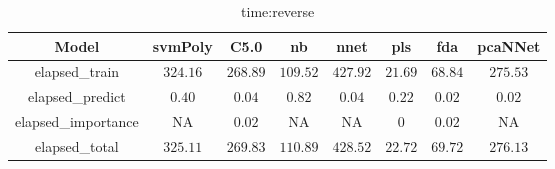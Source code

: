 \begin{table}[!ht]
	\centering
	\begin{tabular}{|c|c|c|c|c|c|c|c|}
		\hline
		Model & svmPoly & C5.0 & nb & nnet & pls & fda & pcaNNet \\ \hline
		elapsed_train & $324.16$ & $268.89$ & $109.52$ & $427.92$ & $21.69$ & $68.84$ & $275.53$ \\ \hline
		elapsed_predict & $0.40$ & $0.04$ & $0.82$ & $0.04$ & $0.22$ & $0.02$ & $0.02$ \\ \hline
		elapsed_importance & NA & $0.02$ & NA & NA & $0$ & $0.02$ & NA \\ \hline
		elapsed_total & $325.11$ & $269.83$ & $110.89$ & $428.52$ & $22.72$ & $69.72$ & $276.13$ \\ \hline
	\end{tabular}
	\caption{time:reverse}
	\label{tab:time:reverse}
\end{table}
